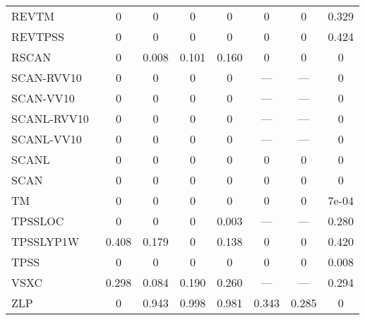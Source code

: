 \begin{table*}
\begin{tabular}{|l|c|c|c|c|c|c|c|}
REVTM~\cite{Jana2019_6356} & 0 & 0 & 0 & 0 & 0 & 0 & 0.329 \\
REVTPSS~\cite{Perdew2009_026403,Perdew2009_026403_err} & 0 & 0 & 0 & 0 & 0 & 0 & 0.424 \\
RSCAN~\cite{Bartok2019_161101} & 0 & 0.008 & 0.101 & 0.160 & 0 & 0 & 0 \\
SCAN-RVV10~\cite{Peng2016_041005} & 0 & 0 & 0 & 0 & --- & --- & 0 \\
SCAN-VV10~\cite{Brandenburg2016_115144} & 0 & 0 & 0 & 0 & --- & --- & 0 \\
SCANL-RVV10~\cite{Mejia2017_052512,Mejia2018_115161,Peng2016_041005} & 0 & 0 & 0 & 0 & --- & --- & 0 \\
SCANL-VV10~\cite{Mejia2017_052512,Mejia2018_115161,Brandenburg2016_115144} & 0 & 0 & 0 & 0 & --- & --- & 0 \\
SCANL~\cite{Mejia2017_052512,Mejia2018_115161,Sun2015_036402} & 0 & 0 & 0 & 0 & 0 & 0 & 0 \\
SCAN~\cite{Sun2015_036402} & 0 & 0 & 0 & 0 & 0 & 0 & 0 \\
TM~\cite{Tao2016_073001} & 0 & 0 & 0 & 0 & 0 & 0 & 7e-04 \\
TPSSLOC~\cite{Constantin2012_035130} & 0 & 0 & 0 & 0.003 & --- & --- & 0.280 \\
TPSSLYP1W~\cite{Dahlke2005_15677} & 0.408 & 0.179 & 0 & 0.138 & 0 & 0 & 0.420 \\
TPSS~\cite{Tao2003_146401,Perdew2004_6898} & 0 & 0 & 0 & 0 & 0 & 0 & 0.008 \\
VSXC~\cite{VanVoorhis1998_400} & 0.298 & 0.084 & 0.190 & 0.260 & --- & --- & 0.294 \\
ZLP~\cite{Zhao1993_918} & 0 & 0.943 & 0.998 & 0.981 & 0.343 & 0.285 & 0 \\
\bottomrule
\end{tabular}
\end{table*}
